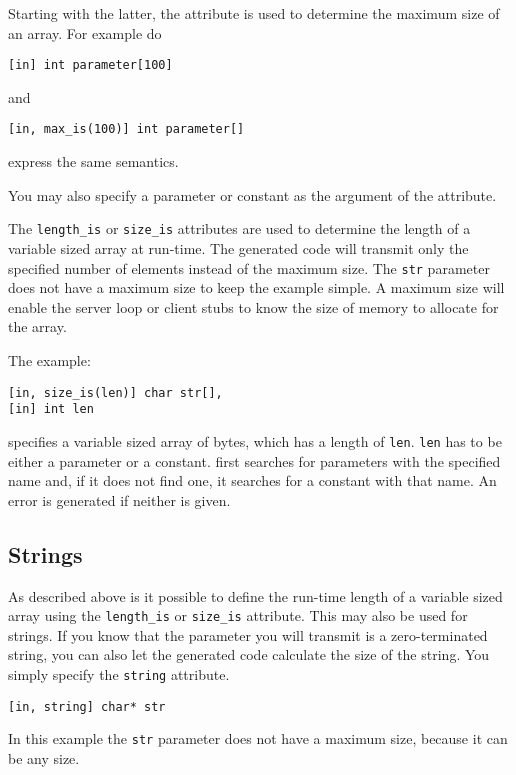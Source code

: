 Starting with the latter, the attribute is used to determine
the maximum size of an array. For example do
\begin{verbatim}
[in] int parameter[100]
\end{verbatim}
and
\begin{verbatim}
[in, max_is(100)] int parameter[]
\end{verbatim}
express the same semantics.

You may also specify a parameter or constant as the 
argument of the attribute.

The \verb|length_is| or \verb|size_is| attributes are used
to determine the length of a variable sized array at run-time.
The generated code will transmit only the specified number of
elements instead of the maximum size. The \verb|str| parameter
does not have a maximum size to keep the example simple. A maximum
size will enable the server loop or client stubs to know the
size of memory to allocate for the array.

The example:
\begin{verbatim}
[in, size_is(len)] char str[], 
[in] int len
\end{verbatim}
specifies a variable sized array of bytes, which has a length
of \verb|len|. \verb|len| has to be either a parameter or
a constant. \dice{} first searches for parameters with the
specified name and, if it does not find one, it searches for
a constant with that name. An error is generated if neither 
is given.


\subsection{Strings}
As described above is it possible to define the run-time length
of a variable sized array using the \verb|length_is| or 
\verb|size_is| attribute. This may also be used for strings.
If you know that the parameter you will transmit is a zero-terminated string,
you can also let the generated code calculate the size of
the string. You simply specify the \verb|string| attribute.

\begin{verbatim}
[in, string] char* str
\end{verbatim}

In this example the \verb|str| parameter does not have a maximum
size, because it can be any size. 

